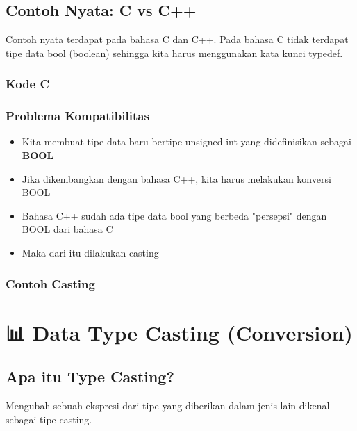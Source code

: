 \subsection{Contoh Nyata: C vs C++}

Contoh nyata terdapat pada bahasa C dan C++. Pada bahasa C tidak terdapat tipe data bool (boolean) sehingga kita harus menggunakan kata kunci typedef.

\subsubsection{Kode C}



\subsubsection{Problema Kompatibilitas}

\begin{itemize}
\item Kita membuat tipe data baru bertipe unsigned int yang didefinisikan sebagai \textbf{BOOL}
\item Jika dikembangkan dengan bahasa C++, kita harus melakukan konversi BOOL
\item Bahasa C++ sudah ada tipe data bool yang berbeda "persepsi" dengan BOOL dari bahasa C
\item Maka dari itu dilakukan casting
\end{itemize}

\subsubsection{Contoh Casting}



\section{📊 Data Type Casting (Conversion)}\label{data-type-casting-conversion}

\subsection{Apa itu Type Casting?}

Mengubah sebuah ekspresi dari tipe yang diberikan dalam jenis lain dikenal sebagai tipe-casting.

